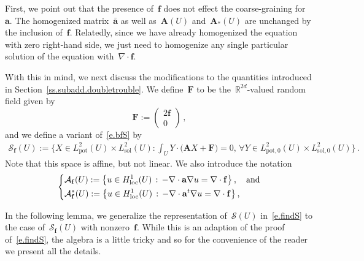 \documentclass[11pt]{article} %
\numberwithin{equation}{section}
\theoremstyle{definition}
\let\originalleft\left
\let\originalright\right
\renewcommand{\left}{\mathopen{}\mathclose\bgroup\originalleft}
\renewcommand{\right}{\aftergroup\egroup\originalright}
\newcommand*{\R}{\ensuremath{\mathbb{R}}}
\newcommand{\f}{\mathbf{f}}
\renewcommand{\a}{\mathbf{a}}
\newcommand{\ahom}{\bar{\a}}
\renewcommand{\S}{\mathcal{S}}
\newcommand{\Lsol}{L^2_{\mathrm{sol}}}
\newcommand{\Lsolo}{L^2_{\mathrm{sol,0}}}
\newcommand{\Lpot}{L^2_{\mathrm{pot}}}
\newcommand{\Lpoto}{L^2_{\mathrm{pot,0}}}
\newcommand{\bfA}{\mathbf{A}}
\newcommand{\bfF}{\mathbf{F}}
\begin{document}
\smallskip

First, we point out that the presence of~$\f$ does not effect the coarse-graining for~$\a$. The homogenized matrix~$\ahom$ as well as~$\bfA(U)$ and~$\bfA_*(U)$ are unchanged by the inclusion of~$\f$. 
Relatedly, since we have already homogenized the equation with zero right-hand side, we just need to homogenize any single particular solution of the equation with~$\nabla \cdot \f$. 

\smallskip

With this in mind,  we next discuss the modifications to the quantities introduced in Section~\ref{ss.subadd.doubletrouble}. We define~$\bfF$ to be the~$\R^{2d}$-valued random field given by
\begin{equation*}
\bfF:=
\begin{pmatrix} 2\f  \\  0 \end{pmatrix}
\,,
\end{equation*}
and we define a variant of~\eqref{e.bfS} by
\begin{align}
\label{e.Sf.this}
\S_\f (U) 
:=
\biggl\{
X \in \Lpot(U) {\times} \Lsol(U) 
 : 
\int_U 
Y {\cdot} 
\bigl( \bfA X {+} \bfF \bigr)
=0, \, 
\forall Y {\in} 
\Lpoto(U) {\times} \Lsolo(U)
\biggr\}
\,.
\end{align}
Note that this space is affine, but not linear. We also introduce the notation
\begin{equation*}
\left\{
\begin{aligned}
& \mathcal{A}_\f (U) := 
\bigl\{ u \in H^1_{\mathrm{loc}}(U)\,:\, -\nabla\cdot \a\nabla u = \nabla \cdot \f \bigr\}\,,  \quad \mbox{and} 
\\
& \mathcal{A}_\f^* (U) := 
\bigl\{ u \in H^1_{\mathrm{loc}}(U)\,:\, -\nabla\cdot \a^t\nabla u = \nabla \cdot \f \bigr\}\,, 
\end{aligned}
\right.
\end{equation*}

In the following lemma, we generalize the representation of~$\S(U)$ in~\eqref{e.findS} to the case of~$\S_\f(U)$ with nonzero~$\f$.
While this is an adaption of the proof of~\eqref{e.findS}, the algebra is a little tricky and so for the convenience of the reader we present all the details. 
\end{document}
